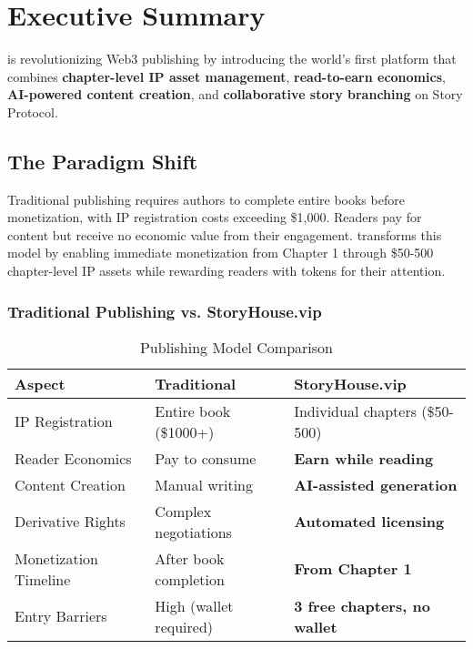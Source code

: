 \section{Executive Summary}
\label{sec:executive-summary}

\storyhouse{} is revolutionizing Web3 publishing by introducing the world's first platform that combines \textbf{chapter-level IP asset management}, \textbf{read-to-earn economics}, \textbf{AI-powered content creation}, and \textbf{collaborative story branching} on Story Protocol.

\subsection{The Paradigm Shift}

\begin{innovation}
Traditional publishing requires authors to complete entire books before monetization, with IP registration costs exceeding \$1,000. Readers pay for content but receive no economic value from their engagement. \storyhouse{} transforms this model by enabling immediate monetization from Chapter 1 through \$50-500 chapter-level IP assets while rewarding readers with \tip{} tokens for their attention.
\end{innovation}

\subsubsection{Traditional Publishing vs. StoryHouse.vip}

\begin{table}[H]
\centering
\caption{Publishing Model Comparison}
\label{tab:publishing-comparison}
\begin{tabular}{@{}lll@{}}
\toprule
\textbf{Aspect} & \textbf{Traditional} & \textbf{StoryHouse.vip} \\
\midrule
IP Registration & Entire book (\$1000+) & Individual chapters (\$50-500) \\
Reader Economics & Pay to consume & \textbf{Earn while reading} \\
Content Creation & Manual writing & \textbf{AI-assisted generation} \\
Derivative Rights & Complex negotiations & \textbf{Automated licensing} \\
Monetization Timeline & After book completion & \textbf{From Chapter 1} \\
Entry Barriers & High (wallet required) & \textbf{3 free chapters, no wallet} \\
\bottomrule
\end{tabular}
\end{table}

